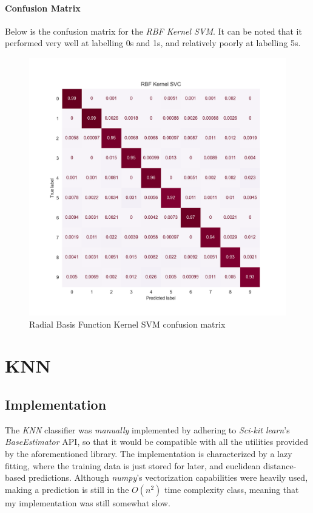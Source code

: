 \paragraph{Confusion Matrix} Below is the confusion matrix for the \textit{RBF Kernel SVM}. It can be noted that it performed very well at labelling 0s and 1s, and relatively poorly at labelling 5s.

\begin{figure}[h]
    \centering
    \includegraphics[scale=0.65]{images/exp-results/svm/svc_rbf_conf-matrix.png}
    \caption{Radial Basis Function Kernel SVM confusion matrix}
    \label{fig:exp_res_rbf_svm_conf_mat}
\end{figure}


\newpage
\section{KNN}

\subsection{Implementation}

The \textit{KNN} classifier was \textit{manually} implemented by adhering to \textit{Sci-kit learn}'s \textit{BaseEstimator} API, so that it would be compatible with all the utilities provided by the aforementioned library. 
The implementation is characterized by a lazy fitting, where the training data is just stored for later, and euclidean distance-based predictions. Although \textit{numpy}'s vectorization capabilities were heavily used, making a prediction is still in the $O(n^2)$ time complexity class, meaning that my implementation was still somewhat slow.

